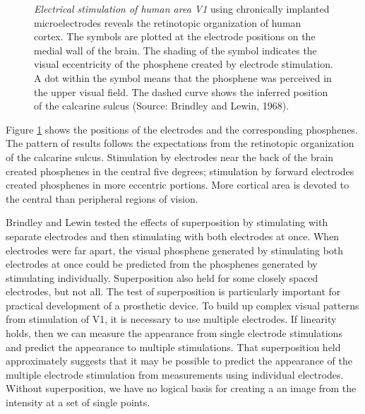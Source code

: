 \begin{figure}
\centerline {
}
\caption[Cortical Stimulation Experiments]{
{\em Electrical stimulation of human area V1} using chronically
implanted microelectrodes reveals the retinotopic organization of
human cortex.  The symbols are plotted at the electrode positions on
the medial wall of the brain.  The shading of the symbol indicates the
visual eccentricity of the phosphene created by electrode
stimulation.  A dot within the symbol means that the phosphene was
perceived in the upper visual field.  The dashed curve shows the inferred
position of the calcarine sulcus (Source: Brindley and Lewin, 1968).
}
\label{f5:brindley.lewin}
\end{figure}
Figure \ref{f5:brindley.lewin} shows the positions of the electrodes
and the corresponding phosphenes.  The pattern of results follows the
expectations from the retinotopic organization of the calcarine
sulcus.  Stimulation by electrodes near the back of the brain created
phosphenes in the central five degrees; stimulation by forward
electrodes created phosphenes in more eccentric portions.  More
cortical area is devoted to the central than peripheral regions of
vision.

Brindley and Lewin tested the effects of superposition by stimulating
with separate electrodes and then stimulating with both electrodes at
once.  When electrodes were far apart, the visual phosphene generated
by stimulating both electrodes at once could be predicted from the
phosphenes generated by stimulating individually.  Superposition also
held for some closely spaced electrodes, but not all.  The test of
superposition is particularly important for practical development of a
prosthetic device.  To build up complex visual patterns from
stimulation of V1, it is necessary to use multiple electrodes.  If
linearity holds, then we can measure the appearance from single
electrode stimulations and predict the appearance to multiple
stimulations.  That superposition held approximately suggests that it
may be possible to predict the appearance of the multiple electrode
stimulation from measurements using individual electrodes.  Without
superposition, we have no logical basis for creating a an image from
the intensity at a set of single points.

